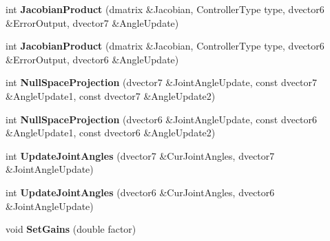\begin{DoxyCompactItemize}
\item 
\hypertarget{classControlBasis_ab647e5b7f4cab559eaa37b015a1c2b2a}{int {\bfseries Jacobian\-Product} (dmatrix \&Jacobian, Controller\-Type type, dvector6 \&Error\-Output, dvector7 \&Angle\-Update)}\label{classControlBasis_ab647e5b7f4cab559eaa37b015a1c2b2a}

\item 
\hypertarget{classControlBasis_a8661d56b93c41a68cc155072fc6f0892}{int {\bfseries Jacobian\-Product} (dmatrix \&Jacobian, Controller\-Type type, dvector6 \&Error\-Output, dvector6 \&Angle\-Update)}\label{classControlBasis_a8661d56b93c41a68cc155072fc6f0892}

\item 
\hypertarget{classControlBasis_aa4e1cba9552ccff6f79c01557a35571a}{int {\bfseries Null\-Space\-Projection} (dvector7 \&Joint\-Angle\-Update, const dvector7 \&Angle\-Update1, const dvector7 \&Angle\-Update2)}\label{classControlBasis_aa4e1cba9552ccff6f79c01557a35571a}

\item 
\hypertarget{classControlBasis_a602c1e75cf70b1cc4b4e25d1e8e5be8d}{int {\bfseries Null\-Space\-Projection} (dvector6 \&Joint\-Angle\-Update, const dvector6 \&Angle\-Update1, const dvector6 \&Angle\-Update2)}\label{classControlBasis_a602c1e75cf70b1cc4b4e25d1e8e5be8d}

\item 
\hypertarget{classControlBasis_a4912e3e55d5ac8dec069e03e70fe823c}{int {\bfseries Update\-Joint\-Angles} (dvector7 \&Cur\-Joint\-Angles, dvector7 \&Joint\-Angle\-Update)}\label{classControlBasis_a4912e3e55d5ac8dec069e03e70fe823c}

\item 
\hypertarget{classControlBasis_aa98c652a767dabfe3d069364697e82ff}{int {\bfseries Update\-Joint\-Angles} (dvector6 \&Cur\-Joint\-Angles, dvector6 \&Joint\-Angle\-Update)}\label{classControlBasis_aa98c652a767dabfe3d069364697e82ff}

\item 
\hypertarget{classControlBasis_a66958286ecb12f089cbd61da990d3cde}{void {\bfseries Set\-Gains} (double factor)}\label{classControlBasis_a66958286ecb12f089cbd61da990d3cde}

\end{DoxyCompactItemize}
